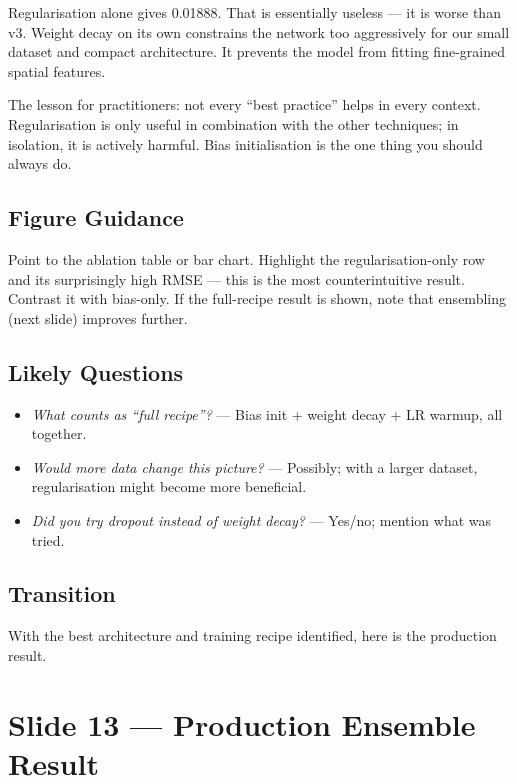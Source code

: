 \documentclass[12pt,a4paper]{article}
\begin{document}
Regularisation alone gives 0.01888. That is essentially useless ---
it is worse than v3. Weight decay on its own constrains the network
too aggressively for our small dataset and compact architecture. It
prevents the model from fitting fine-grained spatial features.

The lesson for practitioners: not every ``best practice'' helps in
every context. Regularisation is only useful in combination with the
other techniques; in isolation, it is actively harmful. Bias
initialisation is the one thing you should always do.

\subsection*{Figure Guidance}
Point to the ablation table or bar chart. Highlight the
regularisation-only row and its surprisingly high RMSE --- this is
the most counterintuitive result. Contrast it with bias-only.
If the full-recipe result is shown, note that ensembling (next slide)
improves further.

\subsection*{Likely Questions}
\begin{itemize}
  \item \emph{What counts as ``full recipe''?}
    --- Bias init + weight decay + LR warmup, all together.
  \item \emph{Would more data change this picture?}
    --- Possibly; with a larger dataset, regularisation might become
    more beneficial.
  \item \emph{Did you try dropout instead of weight decay?}
    --- Yes/no; mention what was tried.
\end{itemize}

\subsection*{Transition}
With the best architecture and training recipe identified, here is
the production result.

\clearpage

\section{Slide 13 --- Production Ensemble Result}
\label{sec:slide13}
\end{document}
